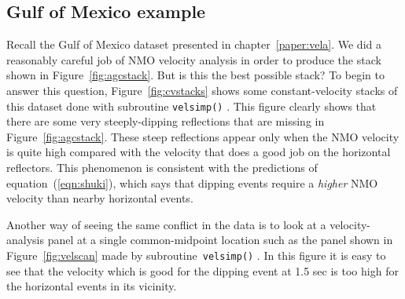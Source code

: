 \subsection{Gulf of Mexico example}
\par
Recall the Gulf of Mexico dataset presented in chapter~\ref{paper:vela}.
We did a reasonably careful job of NMO velocity analysis
in order to produce the stack shown in Figure~\ref{fig:agcstack}.
But is this the best possible stack?
To begin to answer this question, Figure~\ref{fig:cvstacks} shows
some constant-velocity stacks of this dataset done with subroutine
\texttt{velsimp()} .
This figure clearly shows that
there are some very steeply-dipping reflections
that are missing in Figure~\ref{fig:agcstack}.
These steep reflections appear only when the NMO velocity
is quite high compared with the velocity
that does a good job on the horizontal reflectors.
This phenomenon is consistent with 
the predictions of equation~(\ref{eqn:shuki}),
which says that dipping events 
require a {\em higher} NMO velocity than nearby horizontal events.
%
\par
Another way of seeing the same conflict in the data
is to look at a velocity-analysis panel
at a single common-midpoint location
such as the panel shown in Figure~\ref{fig:velscan}
made by subroutine~\texttt{velsimp()} .
In this figure it is easy to see that the velocity
which is good for the dipping event at 1.5 sec is too high
for the horizontal events in its vicinity.
%

